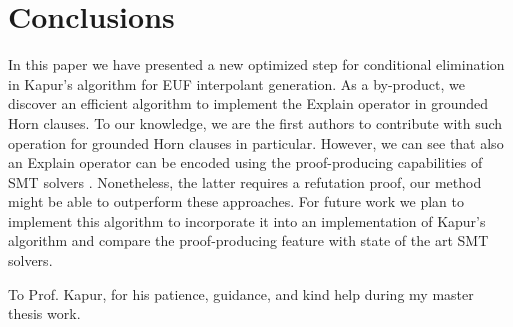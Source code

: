 \documentclass[10pt, sigconf,authordraft]{acmart}
\begin{document}
\section{Conclusions}
In this paper we have presented a new optimized step for conditional elimination
in Kapur's algorithm for EUF interpolant generation. As a by-product, we discover
an efficient algorithm to implement the Explain operator in grounded Horn clauses.
To our knowledge, we are the first authors to contribute with such operation for
grounded Horn clauses in particular. However, we can see that also an Explain
operator can be encoded using the proof-producing capabilities of SMT solvers
\cite{10.1007/978-3-540-78800-3_24, 10.5555/2032305.2032319, 10.1007/978-3-642-02959-2_12, articleProofsInSMT, inproceedingsproofsrefutationsz3}. Nonetheless, the latter
requires a refutation proof, our method might be able to outperform these
approaches.
For future work we plan to implement this algorithm to incorporate it into an
implementation of Kapur's algorithm and compare the proof-producing feature
with state of the art SMT solvers.

\begin{acks}
  To Prof. Kapur, for his patience, guidance, and kind help during
  my master thesis work.
\end{acks}



\end{document}
